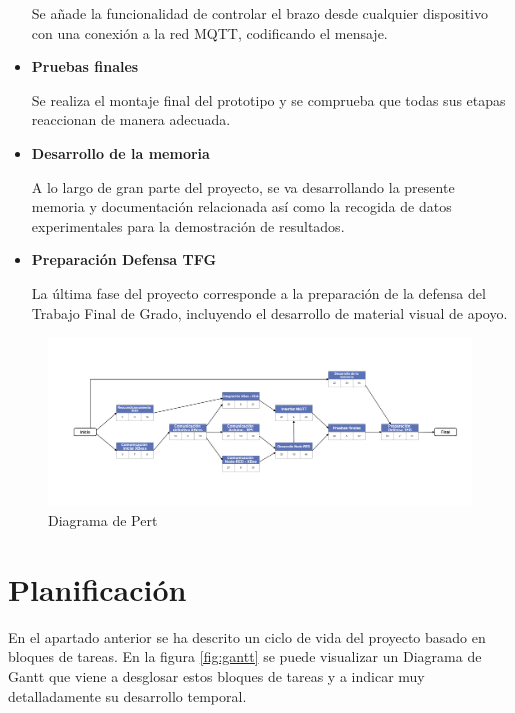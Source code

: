 \begin{itemize}
Se añade la funcionalidad de controlar el brazo desde cualquier dispositivo con una conexión a la red MQTT, codificando el mensaje.

\item \textbf{Pruebas finales}

Se realiza el montaje final del prototipo y se comprueba que todas sus etapas reaccionan de manera adecuada.

\item \textbf{Desarrollo de la memoria}

A lo largo de gran parte del proyecto, se va desarrollando la presente memoria y documentación relacionada así como la recogida de datos experimentales para la demostración de resultados.

\item \textbf{Preparación Defensa TFG}

La última fase del proyecto corresponde a la preparación de la defensa del Trabajo Final de Grado, incluyendo el desarrollo de material visual de apoyo.

\end{itemize}

\begin{landscape}
   	\begin{figure}[H]
   		\centering
   		\includegraphics[width=1.7\textwidth]{figuras/Pert.png}
   		\caption{Diagrama de Pert}
   		\label{fig:pert}
   	\end{figure}
\end{landscape}

\section{Planificación}

En el apartado anterior se ha descrito un ciclo de vida del proyecto basado en bloques de tareas. En la figura \ref{fig:gantt} se puede visualizar un Diagrama de Gantt que viene a desglosar estos bloques de tareas y a indicar muy detalladamente su desarrollo temporal.

